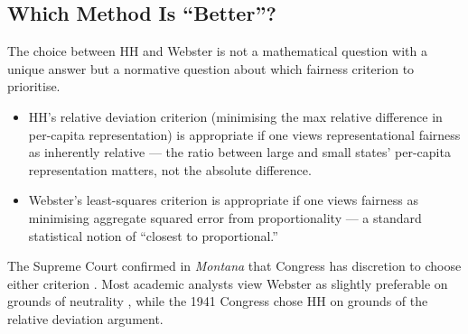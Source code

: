\subsection{Which Method Is ``Better''?}

The choice between HH and Webster is not a mathematical question with
a unique answer but a normative question about which fairness criterion
to prioritise.
\begin{itemize}
  \item HH's relative deviation criterion (minimising the
    max relative difference in per-capita representation) is appropriate
    if one views representational fairness as inherently relative ---
    the ratio between large and small states' per-capita representation
    matters, not the absolute difference.
  \item Webster's least-squares criterion is appropriate if one views
    fairness as minimising aggregate squared error from proportionality ---
    a standard statistical notion of ``closest to proportional.''
\end{itemize}
The Supreme Court confirmed in \textit{Montana} that Congress has
discretion to choose either criterion \citep{montana1992}.
Most academic analysts view Webster as slightly preferable on grounds
of neutrality \citep{balinski1982fair}, while the 1941 Congress
chose HH on grounds of the relative deviation argument.
